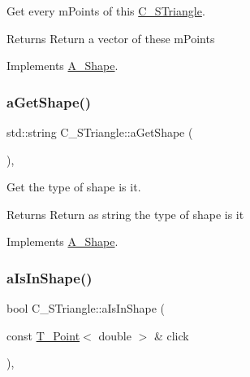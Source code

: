 Get every m\+Points of this \hyperlink{classC__STriangle}{C\+\_\+\+S\+Triangle}. 

\begin{DoxyReturn}{Returns}
Return a vector of these m\+Points 
\end{DoxyReturn}


Implements \hyperlink{classA__Shape_a9fd1285bd63b1fc88943c9969bf01a5c}{A\+\_\+\+Shape}.

\mbox{\label{classC__STriangle_a40c1434870b99112c4457819c9295483}} 
\subsubsection{\texorpdfstring{a\+Get\+Shape()}{aGetShape()}}
{\footnotesize\ttfamily std\+::string C\+\_\+\+S\+Triangle\+::a\+Get\+Shape (\begin{DoxyParamCaption}{ }\end{DoxyParamCaption})\hspace{0.3cm}{\ttfamily [override]}, {\ttfamily [virtual]}}



Get the type of shape is it. 

\begin{DoxyReturn}{Returns}
Return as string the type of shape is it 
\end{DoxyReturn}


Implements \hyperlink{classA__Shape_a1b202256a4e5dcb0edab4ab93a37122c}{A\+\_\+\+Shape}.

\mbox{\label{classC__STriangle_a3bc82d7ea53a6a058b9fb49bbd89282c}} 
\subsubsection{\texorpdfstring{a\+Is\+In\+Shape()}{aIsInShape()}}
{\footnotesize\ttfamily bool C\+\_\+\+S\+Triangle\+::a\+Is\+In\+Shape (\begin{DoxyParamCaption}\item[{const \hyperlink{classT__Point}{T\+\_\+\+Point}$<$ double $>$ \&}]{click }\end{DoxyParamCaption})\hspace{0.3cm}{\ttfamily [override]}, {\ttfamily [virtual]}}



